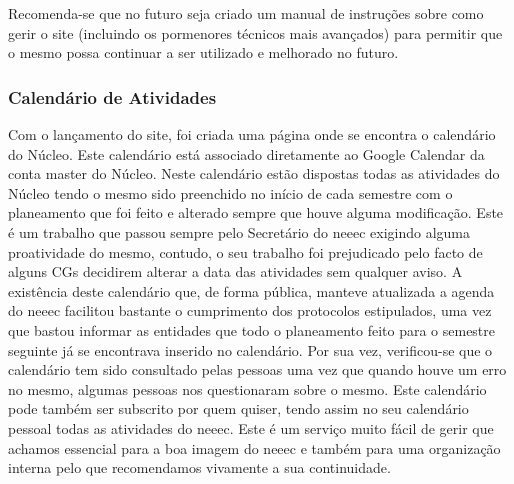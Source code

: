 Recomenda-se que no futuro seja criado um manual de instruções sobre como gerir o site (incluindo os pormenores técnicos mais avançados) para permitir que o mesmo possa continuar a ser utilizado e melhorado no futuro.

\subsubsection{Calendário de Atividades}

Com o lançamento do site, foi criada uma página onde se encontra o calendário do Núcleo. Este calendário está associado diretamente ao Google Calendar da conta master do Núcleo. Neste calendário estão dispostas todas as atividades do Núcleo tendo o mesmo sido preenchido no início de cada semestre com o planeamento que foi feito e alterado sempre que houve alguma modificação. Este é um trabalho que passou sempre pelo Secretário do \acrshort{neeec} exigindo alguma proatividade do mesmo, contudo, o seu trabalho foi prejudicado pelo facto de alguns CGs decidirem alterar a data das atividades sem qualquer aviso. A existência deste calendário que, de forma pública, manteve atualizada a agenda do \acrshort{neeec} facilitou bastante o cumprimento dos protocolos estipulados, uma vez que bastou informar as entidades que todo o planeamento feito para o semestre seguinte já se encontrava inserido no calendário. Por sua vez, verificou-se que o calendário tem sido consultado pelas pessoas uma vez que quando houve um erro no mesmo, algumas pessoas nos questionaram sobre o mesmo. Este calendário pode também ser subscrito por quem quiser, tendo assim no seu calendário pessoal todas as atividades do \acrshort{neeec}. Este é um serviço muito fácil de gerir que achamos essencial para a boa imagem do \acrshort{neeec} e também para uma organização interna pelo que recomendamos vivamente a sua continuidade.